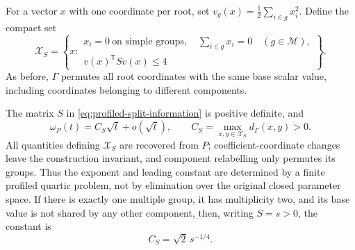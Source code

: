 For a vector $x$ with one coordinate per root, set
$v_g(x)=\tfrac12\sum_{i\in g}x_i^2$. Define the compact set
\begin{equation}\label{eq:quartic-cone-section}
 \mathcal X_S=\left\{x:
 \begin{array}{l}
 x_i=0\ \text{on simple groups},\quad
 \sum_{i\in g}x_i=0\quad(g\in\mathcal M),\\
 v(x)^{\mathsf T}S v(x)\le4
 \end{array}\right\}.
\end{equation}
As before, $\Gamma$ permutes all root coordinates with the same base
scalar value, including coordinates belonging to different components.

\begin{theorem}
\label{thm:quartic-modulus}
The matrix $S$ in \eqref{eq:profiled-split-information} is positive
definite, and
\begin{equation}\label{eq:quartic-modulus}
 \omega_P(t)=C_S\sqrt t+o(\sqrt t),\qquad
 C_S=\max_{x,y\in\mathcal X_S}d_\Gamma(x,y)>0.
\end{equation}
All quantities defining $\mathcal X_S$ are recovered from $P$;
coefficient-coordinate changes leave the construction invariant, and
component relabelling only permutes its groups. Thus the exponent and
leading constant are determined by a finite profiled quartic problem,
not by elimination over the original closed parameter space.
If there is exactly one multiple group, it has multiplicity two, and
its base value is not shared by any other component, then, writing
$S=s>0$, the constant is
\begin{equation}\label{eq:double-root-constant}
 C_S=\sqrt2\,s^{-1/4}.
\end{equation}
\end{theorem}
